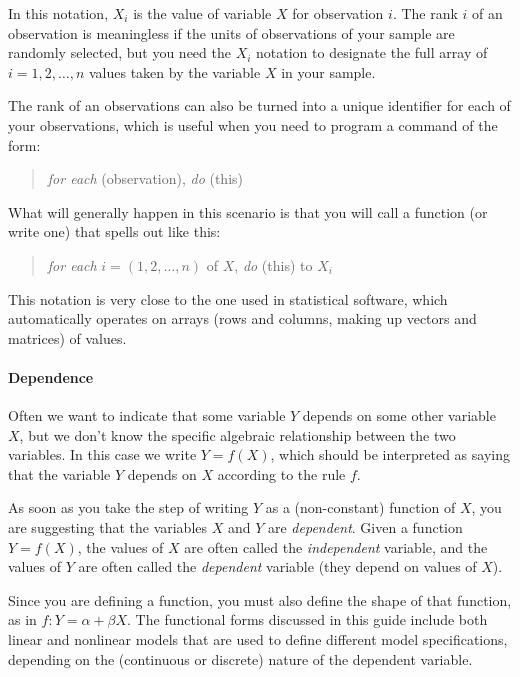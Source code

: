 In this notation, $X_i$ is the value of variable $X$ for observation $i$. The rank $i$ of an observation is meaningless if the units of observations of your sample are randomly selected, but you need the $X_i$ notation to designate the full array of $i = 1,2, \ldots, n$ values taken by the variable $X$ in your sample.%

The rank of an observations can also be turned into a unique identifier for each of your observations, which is useful when you need to program a command of the form:%

\begin{quote}
	\emph{for each} (observation), \emph{do} (this)
\end{quote}

What will generally happen in this scenario is that you will call a function (or write one) that spells out like this:%

\begin{quote}
	\emph{for each} $i = (1,2, \ldots, n)$ of $X$, \emph{do} (this) to $X_i$
\end{quote}

This notation is very close to the one used in statistical software, which automatically operates on arrays (rows and columns, making up vectors and matrices) of values.%

\paragraph{Dependence} %
  Often we want to indicate that some variable $Y$ depends on some other variable $X$, but we don’t know the specific algebraic relationship between the two variables. In this case we write $Y = f(X)$, which should be interpreted as saying that the variable $Y$ depends on $X$ according to the rule $f$.%
  
  As soon as you take the step of writing $Y$ as a (non-constant) function of $X$, you are suggesting that the variables $X$ and $Y$ are \emph{dependent}. Given a function $Y = f(X)$, the values of $X$ are often called the \emph{independent} variable, and the values of $Y$ are often called the \emph{dependent} variable (they depend on values of $X$).%

  Since you are defining a function, you must also define the shape of that function, as in $f: Y = \alpha + \beta X$. The functional forms discussed in this guide include both linear and nonlinear models that are used to define different model specifications, depending on the (continuous or discrete) nature of the dependent variable.%
  
